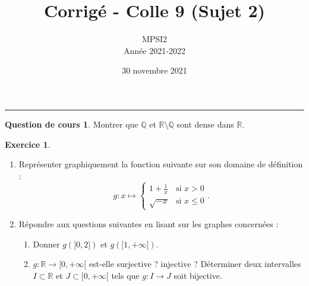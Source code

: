 \documentclass[a4paper, 11pt,openany]{article}%
\title{Corrigé - Colle 9 (Sujet 2)}
\author{MPSI2\\
Année 2021-2022}
\date{30 novembre 2021}
\theoremstyle{plain}
\theoremstyle{definition}
\newtheorem{cours}{Question de cours}
\newtheorem{exo}{Exercice}
\theoremstyle{remark}
\newcommand{\R}{\mathbb{R}}
\newcommand{\Q}{\mathbb{Q}}
\begin{document}
   \maketitle
      \rule{\linewidth}{0.5mm}


\begin{cours}
Montrer que $\Q$ et $\R \setminus \Q$ sont dense dans $\R$.
\end{cours}

\begin{exo}
\begin{enumerate}
\item Représenter graphiquement la fonction suivante sur son domaine de définition :
\[ g : x \mapsto   \left\{
    \begin{array}{ll}
        1 + \frac{1}{x} & \mbox{si } x > 0 \\
        \sqrt{-x} & \mbox{si } x \leqslant 0
    \end{array}
\right..\]
\item Répondre aux questions suivantes en lisant sur les graphes concernées :
\begin{enumerate}
\item Donner $g(]0,2])$ et $g([1,+\infty[)$.
\item $g : \R \to [0,+\infty[$ est-elle surjective ? injective ? Déterminer deux intervalles $I \subset \R$ et $J \subset [0,+\infty[$ tels que $g : I \to J$ soit bijective.
\end{enumerate}
\end{enumerate}
\end{exo}
\end{document}
